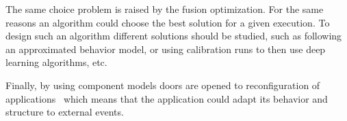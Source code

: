 The same choice problem is raised by the fusion optimization. For the same reasons an algorithm could choose the best solution for a given execution. To design such an algorithm different solutions should be studied, such as following an approximated behavior model, or using calibration runs to then use deep learning algorithms, etc.

Finally, by using component models doors are opened to reconfiguration of applications~\cite{Lanore:2015:RCM:2737166.2737169} which means that the application could adapt its behavior and structure to external events.
